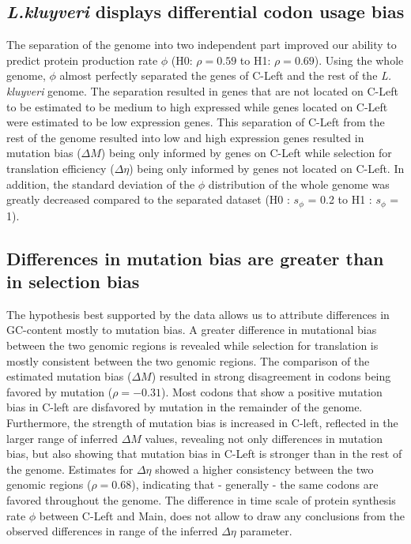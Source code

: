 \documentclass[12pt,draft]{article}
\begin{document}
\subsection*{\textit{L.kluyveri} displays differential codon usage bias}
The separation of the genome into two independent part improved our ability to predict protein production rate $\phi$ (H0: $\rho = 0.59$ to H1: $\rho = 0.69$).
Using the whole genome, $\phi$ almost perfectly separated the genes of C-Left and the rest of the \textit{L. kluyveri} genome. 
The separation resulted in genes that are not located on C-Left to be estimated to be medium to high expressed while genes located on C-Left were estimated to be low expression genes. 
This separation of C-Left from the rest of the genome resulted into low and high expression genes resulted in mutation bias ($\Delta M$) being only informed by genes on C-Left while selection for translation efficiency ($\Delta \eta$) being only informed by genes not located on C-Left. 
In addition, the standard deviation of the $\phi$ distribution of the whole genome was greatly decreased compared to the separated dataset (H0 : $s_{\phi}$ = 0.2 to H1 : $s_{\phi}$ = 1).

\subsection*{Differences in mutation bias are greater than in selection bias}
The hypothesis best supported by the data allows us to attribute differences in GC-content mostly to mutation bias. 
A greater difference in mutational bias between the two genomic regions is revealed while selection for translation is mostly consistent between the two genomic regions. 
The comparison of the estimated mutation bias ($\Delta M$) resulted in strong disagreement in codons being favored by mutation ($\rho = -0.31$). 
Most codons that show a positive mutation bias in C-left are disfavored by mutation in the remainder of the genome.  
Furthermore, the strength of mutation bias is increased in C-left, reflected in the larger range of inferred $\Delta M$ values, revealing not only differences in mutation bias, but also showing that mutation bias in C-Left is stronger than in the rest of the genome. 
Estimates for $\Delta \eta$ showed a higher consistency between the two genomic regions ($\rho = 0.68$), indicating that - generally - the same codons are favored throughout the genome. 
The difference in time scale of protein synthesis rate $\phi$ between C-Left and Main, does not allow to draw any conclusions from the observed differences in range of the inferred $\Delta \eta$ parameter.
\end{document}
